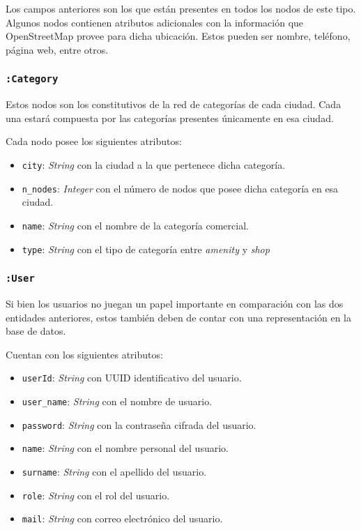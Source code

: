 Los campos anteriores son los que están presentes en todos los nodos de este tipo. Algunos nodos contienen atributos adicionales con la información que OpenStreetMap provee para dicha ubicación. Estos pueden ser nombre, teléfono, página web, entre otros.

\subsubsection{\texttt{:Category}}
Estos nodos son los constitutivos de la red de categorías de cada ciudad. Cada una estará compuesta por las categorías presentes únicamente en esa ciudad.

Cada nodo posee los siguientes atributos:

\begin{itemize}
	\item \texttt{city}: \textit{String} con la ciudad a la que pertenece dicha categoría.
	\item \texttt{n\_nodes}: \textit{Integer} con el número de nodos que posee dicha categoría en esa ciudad.
	\item \texttt{name}: \textit{String} con el nombre de la categoría comercial.
	\item \texttt{type}: \textit{String} con el tipo de categoría entre \textit{amenity} y \textit{shop}
\end{itemize}

\subsubsection{\texttt{:User}}
Si bien los usuarios no juegan un papel importante en comparación con las dos entidades anteriores, estos también deben de contar con una representación en la base de datos.

Cuentan con los siguientes atributos:

\begin{itemize}
	\item \texttt{userId}: \textit{String} con UUID identificativo del usuario.
	\item \texttt{user\_name}: \textit{String} con el nombre de usuario.
	\item \texttt{password}: \textit{String} con la contraseña cifrada del usuario.
	\item \texttt{name}: \textit{String} con el nombre personal del usuario.
	\item \texttt{surname}: \textit{String} con el apellido del usuario.
	\item \texttt{role}: \textit{String} con el rol del usuario.
	\item \texttt{mail}: \textit{String} con correo electrónico del usuario.
\end{itemize}

